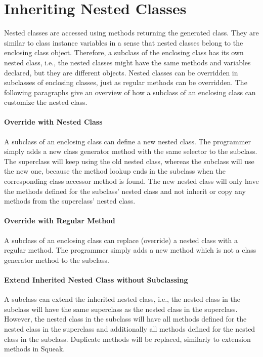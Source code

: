 \section{Inheriting Nested Classes}
\label{sec:concept_inh_nested_cl}
Nested classes are accessed using methods returning the generated class. They are similar to class instance variables in a sense that nested classes belong to the enclosing class object. Therefore, a subclass of the enclosing class has its own nested class, i.e., the nested classes might have the same methods and variables declared, but they are different objects. Nested classes can be overridden in subclasses of enclosing classes, just as regular methods can be overridden. The following paragraphs give an overview of how a subclass of an enclosing class can customize the nested class.

\paragraph{Override with Nested Class}
A subclass of an enclosing class can define a new nested class. The programmer simply adds a new class generator method with the same selector to the subclass. The superclass will keep using the old nested class, whereas the subclass will use the new one, because the method lookup ends in the subclass when the corresponding class accessor method is found. The new nested class will only have the methods defined for the subclass' nested class and not inherit or copy any methods from the superclass' nested class.

\paragraph{Override with Regular Method}
A subclass of an enclosing class can replace (override) a nested class with a regular method. The programmer simply adds a new method which is not a class generator method to the subclass.

\paragraph{Extend Inherited Nested Class without Subclassing}
A subclass can extend the inherited nested class, i.e., the nested class in the subclass will have the same superclass as the nested class in the superclass. However, the nested class in the subclass will have all methods defined for the nested class in the superclass and additionally all methods defined for the nested class in the subclass. Duplicate methods will be replaced, similarly to extension methods in Squeak.


